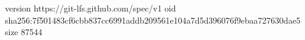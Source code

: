 version https://git-lfs.github.com/spec/v1
oid sha256:7f501483cf6cbb837cc6991addb209561e104a7d5d396076f9ebaa727630dae5
size 87544
